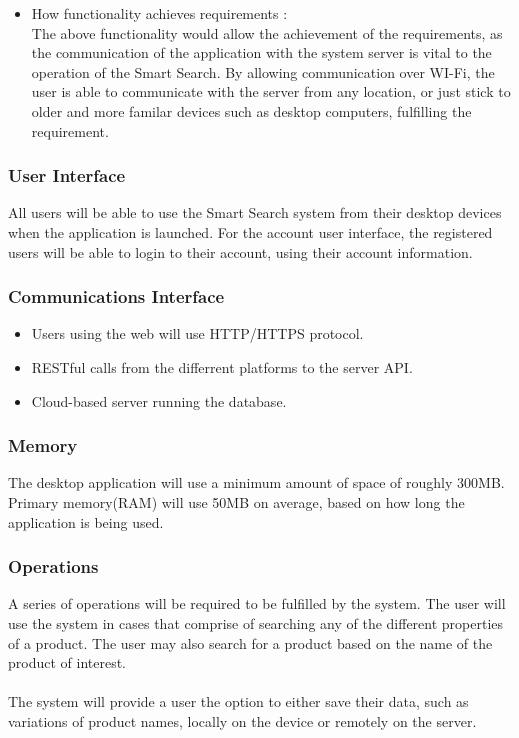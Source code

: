 \documentclass[a4paper,10pt]{article}
\begin{document}
{\begin{enumerate}
\begin{itemize}
					\item How functionality achieves requirements :\\
The above functionality would allow the achievement of the requirements, as the communication of the application with the system server is vital to the operation of the Smart Search. By allowing communication over WI-Fi, the user is able to communicate with the server from any location, or just stick to older and more familar devices such as desktop computers, fulfilling the requirement.
					\end{itemize}
			\end{enumerate} 
}

		
            \subsubsection{User Interface}
	    All users will be able to use the Smart Search system from their desktop devices when the application is launched.
For the account user interface, the registered users will be able to login to their account, using their account information.
\\
	    \subsubsection{Communications Interface}
	 \begin{itemize}
	    \item Users using the web will use HTTP/HTTPS protocol.
	    \item RESTful calls from the differrent platforms to the server API.
	    \item Cloud-based server running the database.
	    \end{itemize}
	    
            \subsubsection{Memory}
	    {The desktop application will use a minimum amount of space of roughly 300MB.\\
		Primary memory(RAM) will use 50MB on average, based on how long the application is being used.}
		
            \subsubsection{Operations}

            	{A series of operations will be required to be fulfilled by the system. The user will use the system in cases that comprise of searching any of the different properties of a product. The user may also search for a product based on the name of the product of interest.\\\\
            	The system will provide a user the option to either save their data, such as variations of product names, locally on the device or remotely on the server.}
		
\end{document}
